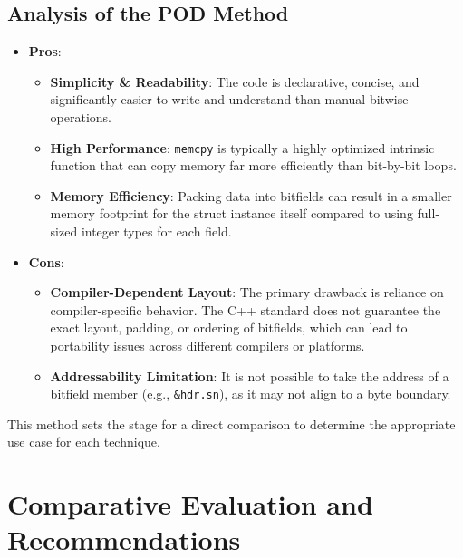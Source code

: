 \documentclass{article}
\begin{document}
\subsection{Analysis of the POD Method}

\begin{itemize}
    \item \textbf{Pros}:
    \begin{itemize}
        \item \textbf{Simplicity \& Readability}: The code is declarative, concise, and significantly easier to write and understand than manual bitwise operations.
        \item \textbf{High Performance}: \texttt{memcpy} is typically a highly optimized intrinsic function that can copy memory far more efficiently than bit-by-bit loops.
        \item \textbf{Memory Efficiency}: Packing data into bitfields can result in a smaller memory footprint for the struct instance itself compared to using full-sized integer types for each field.
    \end{itemize}
    \item \textbf{Cons}:
    \begin{itemize}
        \item \textbf{Compiler-Dependent Layout}: The primary drawback is reliance on compiler-specific behavior. The C++ standard does not guarantee the exact layout, padding, or ordering of bitfields, which can lead to portability issues across different compilers or platforms.
        \item \textbf{Addressability Limitation}: It is not possible to take the address of a bitfield member (e.g., \texttt{\&hdr.sn}), as it may not align to a byte boundary.
    \end{itemize}
\end{itemize}

This method sets the stage for a direct comparison to determine the appropriate use case for each technique.

\section{Comparative Evaluation and Recommendations}
\end{document}
